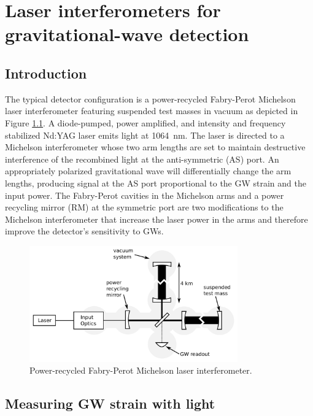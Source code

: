 \chapter{Laser interferometers for gravitational-wave detection}

\section{Introduction}
The typical detector configuration is a power-recycled Fabry-Perot
Michelson laser interferometer featuring suspended test masses in
vacuum as depicted in Figure \ref{fig:IFOschematic}. A diode-pumped,
power amplified, and intensity and frequency stabilized Nd:YAG laser
emits light at 1064~nm. The laser is directed to a Michelson
interferometer whose two arm lengths are set to maintain destructive
interference of the recombined light at the anti-symmetric (AS)
port. An appropriately polarized gravitational wave will
differentially change the arm lengths, producing signal at the AS port
proportional to the GW strain and the input power. The Fabry-Perot
cavities in the Michelson arms and a power recycling mirror (RM) at
the symmetric port are two modifications to the Michelson
interferometer that increase the laser power in the arms and therefore
improve the detector's sensitivity to GWs.

\begin{figure}
\begin{centering}
\includegraphics[width=0.8\textwidth]{figures/IFOschematic.pdf}
\caption{Power-recycled Fabry-Perot Michelson laser interferometer.}
\label{fig:IFOschematic}
\end{centering}
\end{figure}



\section{Measuring GW strain with light}
